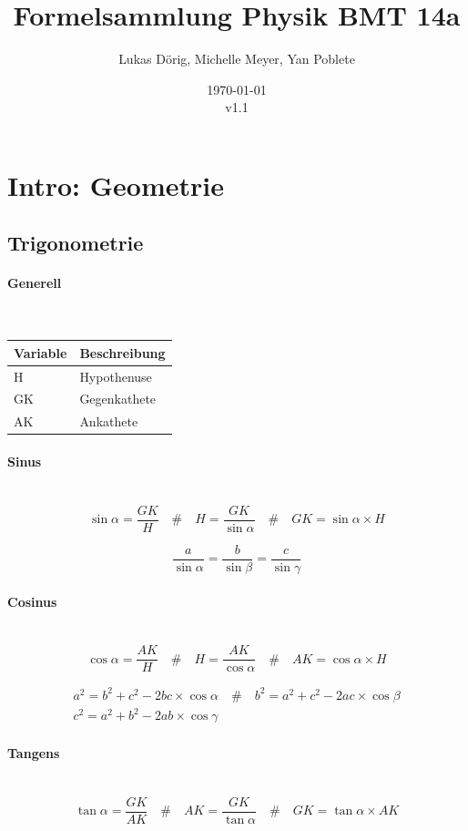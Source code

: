 \documentclass[a4paper,10pt]{article}
\title{Formelsammlung Physik BMT 14a}
\author{Lukas Dörig, Michelle Meyer, Yan Poblete}
\date{\today\\v1.1}
\newcommand{\lbparagraph}[1]{\paragraph{#1}\mbox{}\\}
\newcommand{\eqsp}[1]{\quad\#\quad}
\begin{document}
\maketitle

\tableofcontents

\pagebreak

\section*{Intro: Geometrie}

\subsection*{Trigonometrie}

\lbparagraph{Generell}

\begin{tabular}{l|l}
    Variable & Beschreibung \\
    \hline
    H & Hypothenuse \\
    GK & Gegenkathete \\
    AK & Ankathete
\end{tabular}

\lbparagraph{Sinus}

\begin{equation}
    \sin{\alpha} = \frac{GK}{H}
    \eqsp{}
    H = \frac{GK}{\sin{\alpha}}
    \eqsp{}
    GK = \sin{\alpha} \times H
\end{equation}

\begin{equation}
    \frac{a}{\sin{\alpha}} = \frac{b}{\sin{\beta}} = \frac{c}{\sin{\gamma}}
\end{equation}

\lbparagraph{Cosinus}

\begin{equation}
    \cos{\alpha} = \frac{AK}{H}
    \eqsp{}
    H = \frac{AK}{\cos{\alpha}}
    \eqsp{}
    AK = \cos{\alpha} \times H
\end{equation}

\begin{gather}
    a^2 = b^2 + c^2 - 2bc \times \cos{\alpha}
    \eqsp{}
    b^2 = a^2 + c^2 - 2ac \times \cos{\beta}
    \\
    c^2 = a^2 + b^2 - 2ab \times \cos{\gamma}
\end{gather}

\lbparagraph{Tangens}

\begin{equation}
    \tan{\alpha} = \frac{GK}{AK}
    \eqsp{}
    AK = \frac{GK}{\tan{\alpha}}
    \eqsp{}
    GK = \tan{\alpha} \times AK
\end{equation}
\end{document}
